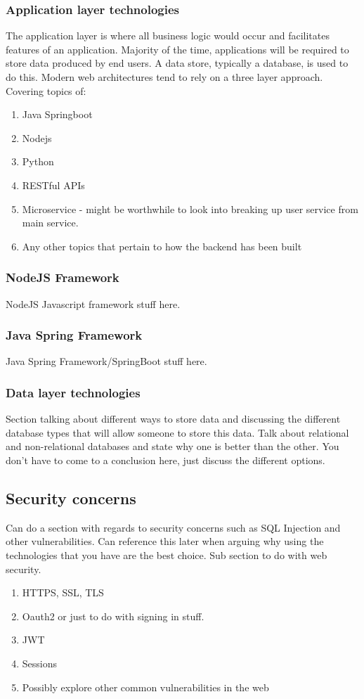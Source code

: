 \subsubsection{Application layer technologies}
The application layer is where all business logic would occur and facilitates features of an application.
Majority of the time, applications will be required to store data produced by end users. A data store, typically a database, is
used to do this.
Modern web architectures tend to rely on a three layer approach. 
Covering topics of:
\begin{enumerate}
    \item Java Springboot
    \item Nodejs
    \item Python
    \item RESTful APIs
    \item Microservice - might be worthwhile to look into breaking up user service from main service.
    \item Any other topics that pertain to how the backend has been built
\end{enumerate}

\subsubsection*{NodeJS Framework}
NodeJS Javascript framework stuff here.

\subsubsection*{Java Spring Framework}
Java Spring Framework/SpringBoot stuff here.

\subsubsection{Data layer technologies}
Section talking about different ways to store data and discussing the different database types
that will allow someone to store this data. Talk about relational and non-relational databases and
state why one is better than the other. You don't have to come to a conclusion here, just discuss
the different options.


\subsection{Security concerns}

Can do a section with regards to security concerns such as SQL Injection and other vulnerabilities.
Can reference this later when arguing why using the technologies that you have are the best choice.
Sub section to do with web security.
\begin{enumerate}
    \item HTTPS, SSL, TLS
    \item Oauth2 or just to do with signing in stuff.
    \item JWT
    \item Sessions
    \item Possibly explore other common vulnerabilities in the web
\end{enumerate}